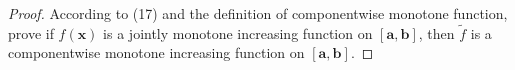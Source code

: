 \documentclass[10pt,a4paper]{amsart}
\begin{document}
\begin{proof}
    According to (17) and the definition of componentwise monotone function, prove if \(f(\boldsymbol{x})\) is a jointly monotone increasing function on \([\boldsymbol{a},\boldsymbol{b}]\), then \(\widetilde{f}\) is a componentwise monotone increasing function on \([\boldsymbol{a},\boldsymbol{b}]\).
\end{proof}
\end{document}

